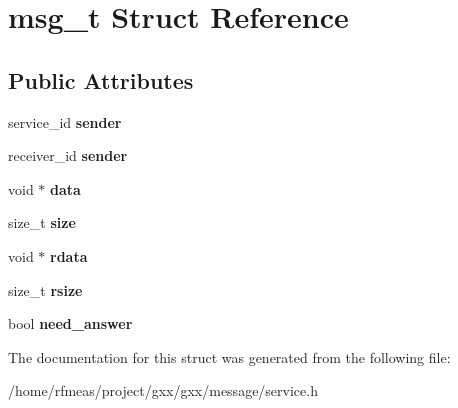 \hypertarget{structmsg__t}{}\section{msg\+\_\+t Struct Reference}
\label{structmsg__t}
\subsection*{Public Attributes}
\begin{DoxyCompactItemize}
\item 
service\+\_\+id {\bfseries sender}\hypertarget{structmsg__t_a0d27b77e4bc76185c817e4c5f13aec9e}{}\label{structmsg__t_a0d27b77e4bc76185c817e4c5f13aec9e}

\item 
receiver\+\_\+id {\bfseries sender}\hypertarget{structmsg__t_aad224a47dfdbfe15857e5c0b6f02716d}{}\label{structmsg__t_aad224a47dfdbfe15857e5c0b6f02716d}

\item 
void $\ast$ {\bfseries data}\hypertarget{structmsg__t_a9f69b9c0337b5050cc1950ff029a7e84}{}\label{structmsg__t_a9f69b9c0337b5050cc1950ff029a7e84}

\item 
size\+\_\+t {\bfseries size}\hypertarget{structmsg__t_a1484a01fb57d9a96ac894f101ce2d053}{}\label{structmsg__t_a1484a01fb57d9a96ac894f101ce2d053}

\item 
void $\ast$ {\bfseries rdata}\hypertarget{structmsg__t_a4c8fdbc428ab51a2325a860222a44e86}{}\label{structmsg__t_a4c8fdbc428ab51a2325a860222a44e86}

\item 
size\+\_\+t {\bfseries rsize}\hypertarget{structmsg__t_a68c378cee496c0f8766a0560744a5d23}{}\label{structmsg__t_a68c378cee496c0f8766a0560744a5d23}

\item 
bool {\bfseries need\+\_\+answer}\hypertarget{structmsg__t_a70c01bc29bb5adecdc956728ba2b316c}{}\label{structmsg__t_a70c01bc29bb5adecdc956728ba2b316c}

\end{DoxyCompactItemize}


The documentation for this struct was generated from the following file\+:\begin{DoxyCompactItemize}
\item 
/home/rfmeas/project/gxx/gxx/message/service.\+h\end{DoxyCompactItemize}

